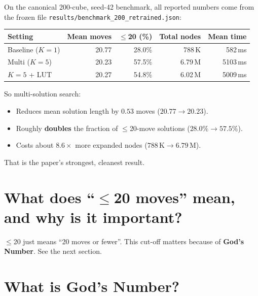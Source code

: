 \documentclass[11pt,a4paper]{article}
\newcommand{\defn}[1]{\textbf{#1}}
\begin{document}
On the canonical 200-cube, seed-42 benchmark, all reported numbers come
from the frozen file
\texttt{results/benchmark\_200\_retrained.json}:

\begin{center}
\begin{tabular}{@{}lrrrr@{}}
\toprule
\textbf{Setting} & \textbf{Mean moves} & \textbf{$\leq$20 (\%)} &
\textbf{Total nodes} & \textbf{Mean time} \\
\midrule
Baseline ($K=1$) & 20.77 & 28.0\% & 788\,K   & 582\,ms  \\
Multi ($K=5$)    & 20.23 & 57.5\% & 6.79\,M  & 5103\,ms \\
$K=5$ + LUT      & 20.27 & 54.8\% & 6.02\,M  & 5009\,ms \\
\bottomrule
\end{tabular}
\end{center}

So multi-solution search:

\begin{itemize}[leftmargin=2em]
  \item Reduces mean solution length by $0.53$ moves
        ($20.77 \to 20.23$).
  \item Roughly \textbf{doubles} the fraction of $\leq$20-move
        solutions ($28.0\% \to 57.5\%$).
  \item Costs about $8.6\times$ more expanded nodes ($788\,\text{K} \to
        6.79\,\text{M}$).
\end{itemize}

That is the paper's strongest, cleanest result.

\section{What does ``$\leq$20 moves'' mean, and why is it important?}

$\leq$20 just means ``20 moves or fewer''. This cut-off matters because
of \defn{God's Number}. See the next section.

\section{What is God's Number?}
\end{document}
